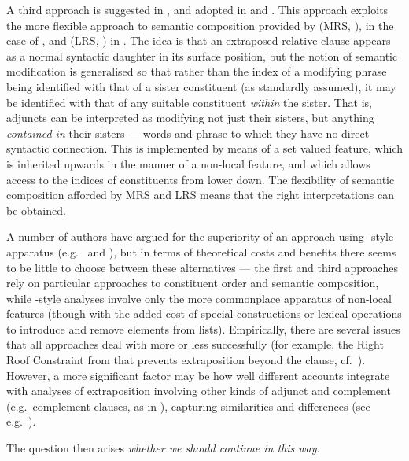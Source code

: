 \documentclass[output=paper,nonflat,draftmode]{./langsci/langscibook}
\begin{document}
A third approach is suggested in \cite{Kiss2005a}, and adopted in \cite{Crysmann2004a} and
\cite{Walker2017}. This
approach exploits the more flexible approach to semantic composition provided by  (MRS, \citealt{CFPS2005a}), in the case of \cite{Kiss2005a}, and  (LRS, \citealt{richtersailer-lrs04}) in \cite{Walker2017}. The idea is
that an extraposed relative clause appears as a normal syntactic daughter in its surface
position, but the notion of semantic modification is generalised so that rather than the
index of a modifying phrase being identified with that of a sister constituent (as
standardly assumed), it may be identified with that of any suitable constituent
\emph{within} the sister. That is, adjuncts can be interpreted as modifying not just their sisters, but
anything \emph{contained in} their sisters --- words and phrase to which they have no
direct syntactic connection.  This is implemented by means of a set valued
 feature, which is inherited upwards in the manner of a non-local
feature, and which allows access to the indices of constituents from lower down. The
flexibility of semantic composition afforded by MRS and LRS means that the right
interpretations can be obtained.

A number of authors have argued for the superiority of an approach using
-style apparatus (e.g.\ \citealt{Mueller2004b} and \citealt{Crysmann2013a}), but in
terms of theoretical costs and benefits there seems to be little to choose between these
alternatives --- the first and third approaches rely on particular approaches to constituent order
and semantic composition, while -style analyses involve only the more
commonplace apparatus of non-local features (though with the added cost of special
constructions or lexical operations to introduce and remove elements from 
lists). Empirically, there are several issues that all approaches deal with more or less
successfully (for example, the Right Roof Constraint from \citealt{Ross67a-Eng} that prevents
extraposition beyond the clause, cf.\ ). However, a more significant factor may
be how well different accounts integrate with analyses of extraposition involving other kinds of
adjunct and complement (e.g.\ complement clauses, as in ), capturing similarities
and differences (see e.g.\ \citealt{Crysmann2013a}).
\begin{exe}\ex\begin{xlist}
  \label{x:rc-125}
  \label{x:rc-126}
\end{xlist}\end{exe}
\begin{exe}\ex\label{x:rc-127}
  The question then arises \emph{whether we should continue in this way}.
\end{exe}
  
\end{document}
